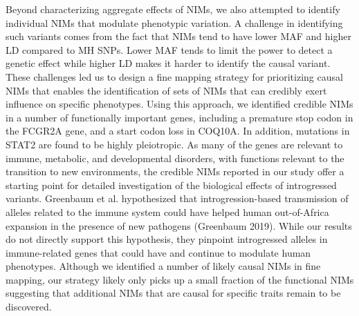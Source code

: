 Beyond characterizing aggregate effects of NIMs, we also attempted to identify individual NIMs that modulate phenotypic variation. A challenge in identifying such variants comes from the fact that NIMs tend to have lower MAF and higher LD compared to MH SNPs. Lower MAF tends to limit the power to detect a genetic effect while higher LD makes it harder to identify the causal variant. These challenges led us to design a fine mapping strategy for prioritizing causal NIMs that enables the identification of sets of NIMs that can credibly exert influence on specific phenotypes. Using this approach, we identified credible NIMs in a number of functionally important genes, including a premature stop codon in the FCGR2A gene, and a start codon loss in COQ10A. In addition, mutations in STAT2 are found to be highly pleiotropic. As many of the genes are relevant to immune, metabolic, and developmental disorders, with functions relevant to the transition to new environments, the credible NIMs reported in our study offer a starting point for detailed investigation of the biological effects of introgressed variants. Greenbaum et al. hypothesized that introgression-based transmission of alleles related to the immune system could have helped human out-of-Africa expansion in the presence of new pathogens (Greenbaum 2019). While our results do not directly support this hypothesis, they pinpoint introgressed alleles in immune-related genes that could have and continue to modulate human phenotypes. Although we identified a number of likely causal NIMs in fine mapping, our strategy likely only picks up a small fraction of the functional NIMs suggesting that additional NIMs that are causal for specific traits remain to be discovered. 

